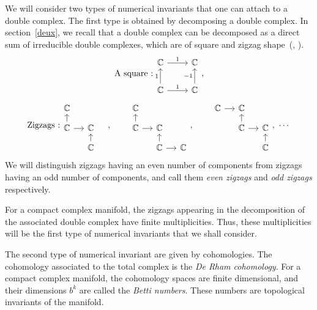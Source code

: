 \documentclass[leqno]{article}
\theoremstyle{definition}
\numberwithin{equation}{section}
\begin{document}
We will consider two types of numerical invariants that one can attach to a double complex. 
The first type is obtained by decomposing a double complex.
In section~\ref{deux}, we recall that a double complex can be decomposed 
as a direct sum of irreducible double complexes, 
which are of square and zigzag shape~(\cite{Ste}, \cite{KQ}). 
\[
\text{A square :}
\begin{tikzcd}
\mathbb{C} \arrow[r, "1"] 
& \mathbb{C} \\
\mathbb{C} \arrow[r, "1"] \arrow[u, "1"]
& \mathbb{C} \arrow[u, "-1"] 
\end{tikzcd},
\]
\[
\text{Zigzags :}
\begin{tikzcd}[row sep=small, column sep = small]
\mathbb{C} & & \\
\mathbb{C} \arrow[u] \arrow[r] & \mathbb{C} & \\
& \mathbb{C} \arrow[u]
\end{tikzcd},
\quad \quad
\begin{tikzcd}[row sep=small, column sep = small]
\mathbb{C} & & \\
\mathbb{C} \arrow[u] \arrow[r] & \mathbb{C} & \\
& \mathbb{C} \arrow[u] \arrow[r] & \mathbb{C}
\end{tikzcd},
\quad \quad
\begin{tikzcd}[row sep=small, column sep = small]
\mathbb{C}\arrow[r] & \mathbb{C} & \\
& \mathbb{C} \arrow[u] \arrow[r] & \mathbb{C} \\
& & \mathbb{C} \arrow[u]
\end{tikzcd},
\ 
\cdots
\]
We will distinguish zigzags having an even number of components from zigzags having an odd number of components, and call them {\sl even zigzags} and {\sl odd zigzags} respectively.

For a compact complex manifold, the zigzags appearing in the decomposition of the associated double complex have finite multiplicities. Thus, these multiplicities will be the first type of numerical invariants that we shall consider.

The second type of numerical invariant are given by cohomologies.
The cohomology associated to the total complex is the {\sl De Rham cohomology}. 
For a compact complex manifold, the cohomology spaces are finite dimensional, and their dimensions
$b^k$ are called the {\sl Betti numbers}. These numbers are topological invariants of the manifold.
\end{document}
